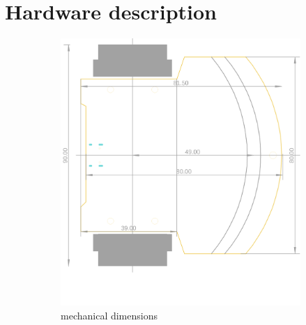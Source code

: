 \documentclass[12pt,twoside,onecolumn,openany,extrafontsizes,dvipsnames]{memoir}
\title{\booktitle}
\author{\authorname}
\begin{document}
\chapter{Hardware description}


    \newpage
    \begin{figure}[h]
        \begin{subfigure}{.5\textwidth}
            \centering
            \includegraphics[scale=0.35]{../images/robot/board_dims_a.png}
            \caption{mechanical dimensions}
            \label{fig:mechanical_dimensions}
        \end{subfigure}%
        \begin{subfigure}{.5\textwidth}
            \centering

\end{subfigure}
\end{figure}
\end{document}
